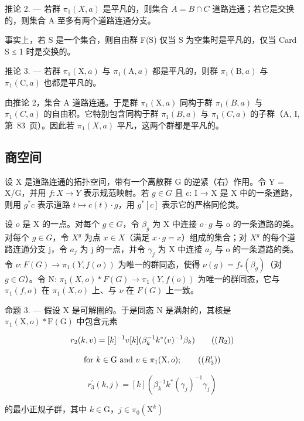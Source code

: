 推论 2. --- 若群 \(\pi_{1}(X,a)\) 是平凡的，则集合 \(A = B \cap C\) 道路连通；若它是交换的，则集合 A 至多有两个道路连通分支。

事实上，若 S 是一个集合，则自由群 F(S) 仅当 S 为空集时是平凡的，仅当 Card S ≤ 1 时是交换的。

推论 3. --- 若群 \(\pi_1(\mathrm{X},a)\) 与 \(\pi_1(\mathrm{A},a)\) 都是平凡的，则群 \(\pi_1(\mathrm{B},a)\) 与 \(\pi_1(\mathrm{C},a)\) 也都是平凡的。

由推论 2，集合 A 道路连通。于是群 \(\pi_1(\mathrm{X},a)\) 同构于群 \(\pi_{1}(B,a)\) 与 \(\pi_{1}(C,a)\) 的自由积。它特别包含同构于群 \(\pi_{1}(B,a)\) 与 \(\pi_{1}(C,a)\) 的子群（A, I, 第~83~页）。因此若 \(\pi_{1}(X,a)\) 平凡，这两个群都是平凡的。

\subsection{商空间}

设 X 是道路连通的拓扑空间，带有一个离散群 G 的逆紧（右）作用。令 Y = X/G，并用 \(f: X \to Y\) 表示规范映射。若 \(g \in G\) 且 c: I → X 是 X 中的一条道路，则用 \(g^{*}c\) 表示道路 \(t \mapsto c(t) \cdot g\)，用 \(g^{*}[c]\) 表示它的严格同伦类。

设 \(o\) 是 X 的一点。对每个 \(g \in G\)，令 \(\beta_{g}\) 为 X 中连接 \(o \cdot g\) 与 o 的一条道路的类。对每个 \(g \in G\)，令 \(X^{g}\) 为点 \(x \in X\)（满足 \(x \cdot g = x\)）组成的集合；对 \(X^{g}\) 的每个道路连通分支 j，令 \(a_{j}\) 为 j 的一点，并令 \(\gamma_{j}\) 为 X 中连接 \(a_{j}\) 与 o 的一条道路的类。令 \(\nu: F(G) \to \pi_{1}(Y, f(o))\) 为唯一的群同态，使得 \(\nu(g) = f_{*}(\beta_{g})\)（对 \(g \in G\)）。令 N: \(\pi_{1}(X, o) * F(G) \to \pi_{1}(Y, f(o))\) 为唯一的群同态，它与 \(\pi_{1}(f, o)\) 在 \(\pi_{1}(X, o)\) 上、与 \(\nu\) 在 \(F(G)\) 上一致。

命题 3. --- 假设 X 是可解圈的。于是同态 N 是满射的，其核是 \(\pi_{1}(\mathrm{X},o)*\mathrm{F}(\mathrm{G})\) 中包含元素

\[
r _ {2} (k, v) = [ k ] ^ {- 1} v [ k ] (\beta_ {k} ^ {- 1} k ^ {*} (v) ^ {- 1} \beta_ {k})\tag{\((R_{2})\)}
\]

\[
\text {for } k \in \mathrm{G} \text { and } v \in \pi_ {1} (\mathrm{X}, o);\tag{\((R_{3}^{\prime})\)}
\]

\[
r _ {3} ^ {\prime} (k, j) = [ k ] (\beta_ {k} ^ {- 1} k ^ {*} (\gamma_ {j}) ^ {- 1} \gamma_ {j})
\]

的最小正规子群，其中 \(k\in \mathrm{G}\)，\(j\in \pi_0(\mathrm{X}^k)\)

